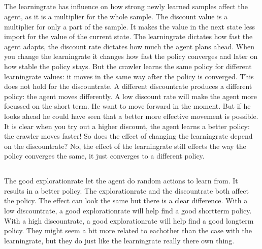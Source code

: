 \subsection{}

The learningrate has influence on how strong newly learned samples 
affect the agent, as it is a multiplier for the whole sample.
The discount value is a multiplier for only a part of the sample.
It makes the value in the next state less import for the value of the 
current state. The learningrate dictates how fast the agent adapts, 
the discount rate dictates how much the agent plans ahead. When you 
change the learningrate it changes how fast the policy converges and 
later on how stable the policy stays. But the crawler learns the same 
policy for different learningrate values: it moves in the same way 
after the policy is converged. This does not hold for the discountrate.
A different discountrate produces a different policy: the agent moves 
differently. A low discount rate will make the agent more focussed on 
the short term. He want to move forward in the moment. But if he looks 
ahead he could have seen that a better more effective movement is 
possible. It is clear when you try out a higher discount, the agent 
learns a better policy: the crawler moves faster! So does the effect 
of changing the learningrate depend on the discountrate? No, the effect 
of the learningrate still effects the way the policy converges the 
same, it just converges to a different policy.

\subsection{}

The good explorationrate let the agent do random actions to learn from.
It results in a better policy. The explorationrate and the discountrate
both affect the policy. The effect can look the same but there is a 
clear difference. With a low discountrate, a good explorationrate will 
help find a good shortterm policy. With a high discountrate, a good 
explorationrate will help find a good longterm policy. They might seem 
a bit more related to eachother than the case with the learningrate, 
but they do just like the learningrate really there own thing.